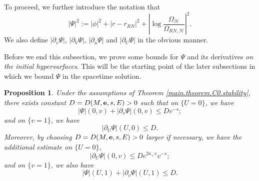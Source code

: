 \documentclass[10pt, reqno]{amsart}
\newtheorem{proposition}[theorem]{Proposition}
\theoremstyle{definition}
\theoremstyle{remark}
\numberwithin{equation}{section}
\newcommand{\rd}{\partial}
\newcommand{\0}{\emptyset}
\newcommand{\Omg}{\Omega}
\newcommand{\f}{\frac}
\begin{document}
To proceed, we further introduce the notation that
$$|\Psi|^2:=|\phi|^2+|r-r_{RN}|^2+ \left\vert \log\f{\Omg_\mathcal H}{\Omg_{RN,\mathcal H}} \right\vert^{2}.$$
We also define $|\rd_v\Psi|$, $|\rd_V\Psi|$, $|\rd_u\Psi|$ and $|\rd_U\Psi|$ in the obvious manner.

Before we end this subsection, we prove some bounds for $\Psi$ and its derivatives \emph{on the initial hypersurfaces}. This will be the starting point of the later subsections in which we bound $\Psi$ in the spacetime solution. 
\begin{proposition}\label{initial.bound}
Under the assumptions of Theorem \ref{main.theorem.C0.stability}, there exists constant $D=D(M,{\bf e},s,E)>0$ such that on $\{U=0\}$, we have
\begin{equation}\label{initial.horizon}
|\Psi|(0,v)+|\rd_v\Psi|(0,v)\leq Dv^{-s};
\end{equation}
and on $\{v=1\}$, we have
\begin{equation}\label{initial.1}
|\rd_U\Psi|(U,0)\leq D.
\end{equation}
Moreover, by choosing $D=D(M,{\bf e},s,E)>0$ larger if necessary, we have the additional estimate on $\{U=0\}$,
\begin{equation}\label{initial.horizon.2}
|\rd_U\Psi|(0,v)\leq De^{2\kappa_+ v}v^{-s};
\end{equation}
and on $\{v=1\}$, we also have
\begin{equation}\label{initial.1.2}
|\Psi|(U,1)+|\rd_v\Psi|(U,1)\leq D.
\end{equation}
\end{proposition}
\end{document}
